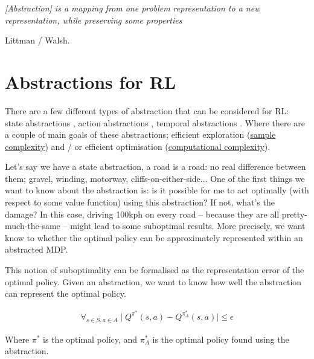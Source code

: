 \begin{displayquote}
  \textit{[Abstraction] is a mapping from one problem representation to a new representation, while preserving some properties}
\end{displayquote} Littman / Walsh.


\section{Abstractions for RL}

There are a few different types of abstraction that can be considered for RL:
state abstractions \cite{Littman2006,Haarnoja,Cuccu2018,Zhonga,Vezzani2019,Abel2018,Duan2018,Abel2017,Silver2016a},
action abstractions \cite{Chandak2019,Bester2019,Tennenholtz2019}, temporal abstractions \cite{Rafati,Mankowitz2018,Harutyunyan2017,Fruit2017,Riemer2018,Bacon2018,Achiam2018,Pham2019,Konidaris2018,Haarnoja,Sutton1999,Fruit2017a,Bacon2016a,Jinnai2018,Nachum2018}.
Where there are a couple of main goals of these abstractions; efficient exploration
(\href{https://en.wikipedia.org/wiki/Sample_complexity}{sample complexity})
and / or efficient optimisation (\href{https://en.wikipedia.org/wiki/Computational_complexity_theory}{computational complexity}).

Let's say we have a state abstraction, a road is a road: no real difference
between them; gravel, winding, motorway, cliffs-on-either-side...
One of the first things we want to know about the abstraction is:
is it possible for me to act optimally (with respect to some value function)
using this abstraction? If not, what's the damage? In this case, driving 100kph on every road --
because they are all pretty-much-the-same -- might lead to some suboptimal results.
More precisely, we want know to whether the optimal policy can be approximately represented within an abstracted MDP.

This notion of suboptimality can be formalised as the representation error of the optimal
policy. Given an abstraction, we want to know how well
the abstraction can represent the optimal policy. \cite{Littman2006, Abel2017}

\begin{align}
\forall_{s\in S, a\in A} \mid Q^{\pi^* }(s, a) - Q^{\pi_{A}^* }(s, a) \mid \le \epsilon
\end{align}

Where $\pi^{* }$ is the optimal policy, and $\pi_{A}^{* }$ is the optimal
policy found using the abstraction.

